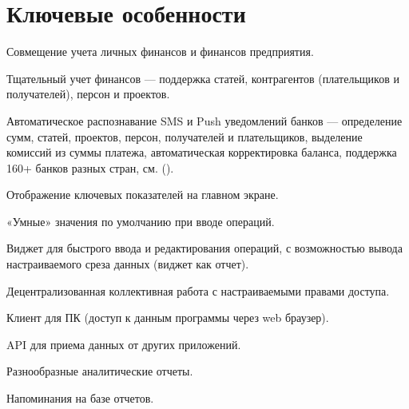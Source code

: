 \documentclass[a4paper,10pt,russian]{sphinxmanual}
\begin{document}
\noindent{}

\noindent{}

\noindent{}


\section{Ключевые особенности}
\label{\detokenize{about:id2}}
\sphinxAtStartPar
Совмещение учета личных финансов и финансов предприятия.

\sphinxAtStartPar
Тщательный учет финансов — поддержка статей, контрагентов (плательщиков и получателей), персон и проектов.

\sphinxAtStartPar
Автоматическое распознавание SMS и Push уведомлений банков — определение сумм, статей, проектов, персон,
получателей и плательщиков, выделение комиссий из суммы платежа, автоматическая корректировка баланса,
поддержка 160+ банков разных стран, см. {\hyperref[\detokenize{banks:chapter-supported-banks}]{}} ().

\sphinxAtStartPar
Отображение ключевых показателей на главном экране.

\sphinxAtStartPar
«Умные» значения по умолчанию при вводе операций.

\sphinxAtStartPar
Виджет для быстрого ввода и редактирования операций, с возможностью вывода настраиваемого среза данных (виджет как отчет).

\sphinxAtStartPar
Децентрализованная коллективная работа с настраиваемыми правами доступа.

\sphinxAtStartPar
Клиент для ПК (доступ к данным программы через web браузер).

\sphinxAtStartPar
API для приема данных от других приложений.

\sphinxAtStartPar
Разнообразные аналитические отчеты.

\sphinxAtStartPar
Напоминания на базе отчетов.
\end{document}
